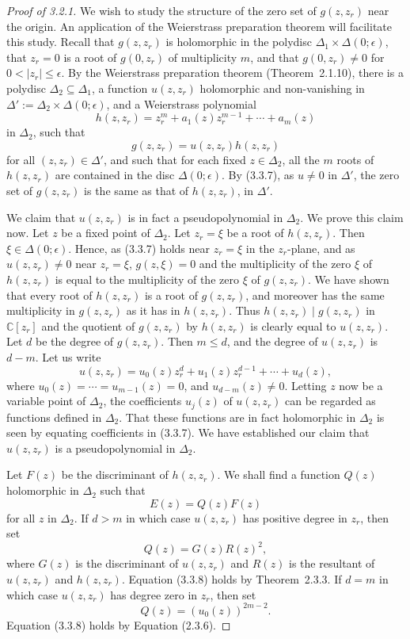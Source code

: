 \documentclass[11pt]{article}
\theoremstyle{plain}
\theoremstyle{definition}
\newcommand{\C}{\mathbb{C}}
\begin{document}
\begin{proof}[Proof of 3.2.1]
We wish to study the structure of the zero set of $g(z, z_r)$ near
the origin. An application of the Weierstrass preparation theorem will
facilitate this study. Recall that $g(z, z_r)$ is holomorphic in the
polydisc $\Delta_1 \times \Delta(0; \epsilon)$, that $z_r = 0$ is a
root of $g(0, z_r)$ of multiplicity $m$, and that $g(0, z_r) \ne 0$
for $0 < |z_r| \le \epsilon$. By the Weierstrass preparation theorem
(Theorem~2.1.10), there is a polydisc
$\Delta_2 \subseteq \Delta_1$, a function $u(z, z_r)$ holomorphic and
non-vanishing in $\Delta' := \Delta_2 \times \Delta(0; \epsilon)$,
and a Weierstrass polynomial
\[
h(z, z_r) = z_r^m + a_1(z) z_r^{m-1} + \cdots + a_m(z)
\]
in $\Delta_2$, such that
\begin{equation}
g(z, z_r) = u(z, z_r) h(z, z_r) \tag{3.3.7}
\end{equation}
for all $(z, z_r) \in \Delta'$, and such that for each fixed
$z \in \Delta_2$, all the $m$ roots of $h(z, z_r)$ are contained in
the disc $\Delta(0; \epsilon)$. By (3.3.7), as $u \ne 0$ in $\Delta'$,
the zero set of $g(z, z_r)$ is the same as that of $h(z, z_r)$, in
$\Delta'$.

We claim that $u(z, z_r)$ is in fact a pseudopolynomial in $\Delta_2$.
We prove this claim now. Let $z$ be a fixed point of $\Delta_2$. Let
$z_r = \xi$ be a root of $h(z, z_r)$. Then $\xi \in \Delta(0; \epsilon)$.
Hence, as (3.3.7) holds near $z_r = \xi$ in the $z_r$-plane, and as
$u(z, z_r) \ne 0$ near $z_r = \xi$, $g(z, \xi) = 0$ and the
multiplicity of the zero $\xi$ of $h(z, z_r)$ is equal to the
multiplicity of the zero $\xi$ of $g(z, z_r)$. We have shown that
every root of $h(z, z_r)$ is a root of $g(z, z_r)$, and moreover has
the same multiplicity in $g(z, z_r)$ as it has in $h(z, z_r)$. Thus
$h(z, z_r) \mid g(z, z_r)$ in $\C[z_r]$ and the quotient of
$g(z, z_r)$ by $h(z, z_r)$ is clearly equal to $u(z, z_r)$. Let $d$
be the degree of $g(z, z_r)$. Then $m \le d$, and the degree of
$u(z, z_r)$ is $d - m$. Let us write
\[
u(z, z_r) = u_0(z) z_r^d + u_1(z) z_r^{d-1} + \cdots + u_d(z),
\]
where $u_0(z) = \cdots = u_{m-1}(z) = 0$, and $u_{d-m}(z) \ne 0$.
Letting $z$ now be a variable point of $\Delta_2$, the coefficients
$u_j(z)$ of $u(z, z_r)$ can be regarded as functions defined in
$\Delta_2$. That these functions are in fact holomorphic in $\Delta_2$
is seen by equating coefficients in (3.3.7). We have established our
claim that $u(z, z_r)$ is a pseudopolynomial in $\Delta_2$.

Let $F(z)$ be the discriminant of $h(z, z_r)$. We shall find a
function $Q(z)$ holomorphic in $\Delta_2$ such that
\begin{equation}
E(z) = Q(z) F(z) \tag{3.3.8}
\end{equation}
for all $z$ in $\Delta_2$. If $d > m$ in which case $u(z, z_r)$ has
positive degree in $z_r$, then set
\[
Q(z) = G(z) R(z)^2,
\]
where $G(z)$ is the discriminant of $u(z, z_r)$ and $R(z)$ is the
resultant of $u(z, z_r)$ and $h(z, z_r)$. Equation (3.3.8) holds by
Theorem~2.3.3. If $d = m$ in which case $u(z, z_r)$ has degree zero
in $z_r$, then set
\[
Q(z) = (u_0(z))^{2m - 2}.
\]
Equation (3.3.8) holds by Equation (2.3.6).


\end{proof}
\end{document}

